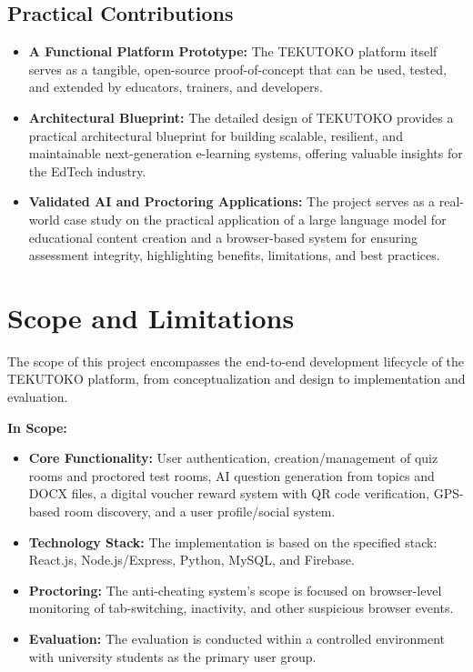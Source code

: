 \subsection{Practical Contributions}
\begin{itemize}
    \item \textbf{A Functional Platform Prototype:} The TEKUTOKO platform itself serves as a tangible, open-source proof-of-concept that can be used, tested, and extended by educators, trainers, and developers.
    \item \textbf{Architectural Blueprint:} The detailed design of TEKUTOKO provides a practical architectural blueprint for building scalable, resilient, and maintainable next-generation e-learning systems, offering valuable insights for the EdTech industry.
    \item \textbf{Validated AI and Proctoring Applications:} The project serves as a real-world case study on the practical application of a large language model for educational content creation and a browser-based system for ensuring assessment integrity, highlighting benefits, limitations, and best practices.
\end{itemize}

\section{Scope and Limitations}
\label{sec:intro_scope}
The scope of this project encompasses the end-to-end development lifecycle of the TEKUTOKO platform, from conceptualization and design to implementation and evaluation.

\textbf{In Scope:}
\begin{itemize}
    \item \textbf{Core Functionality:} User authentication, creation/management of quiz rooms and proctored test rooms, AI question generation from topics and DOCX files, a digital voucher reward system with QR code verification, GPS-based room discovery, and a user profile/social system.
    \item \textbf{Technology Stack:} The implementation is based on the specified stack: React.js, Node.js/Express, Python, MySQL, and Firebase.
    \item \textbf{Proctoring:} The anti-cheating system's scope is focused on browser-level monitoring of tab-switching, inactivity, and other suspicious browser events.
    \item \textbf{Evaluation:} The evaluation is conducted within a controlled environment with university students as the primary user group.
\end{itemize}

